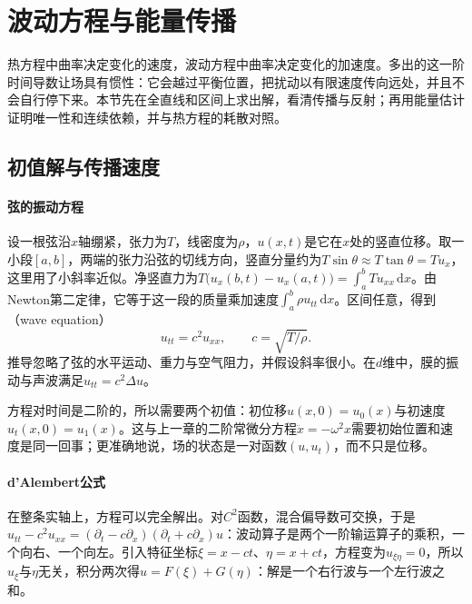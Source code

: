
\section{波动方程与能量传播}
\label{sec:pde-wave}

热方程中曲率决定变化的速度，波动方程中曲率决定变化的加速度。多出的这一阶时间导数让场具有惯性：它会越过平衡位置，把扰动以有限速度传向远处，并且不会自行停下来。本节先在全直线和区间上求出解，看清传播与反射；再用能量估计证明唯一性和连续依赖，并与热方程的耗散对照。

\subsection{初值解与传播速度}
\label{sec:pde-wave-solution}

\paragraph{弦的振动方程}
设一根弦沿$x$轴绷紧，张力为$T$，线密度为$\rho$，$u(x,t)$是它在$x$处的竖直位移。取一小段$[a,b]$，两端的张力沿弦的切线方向，竖直分量约为$T\sin\theta\approx T\tan\theta=Tu_x$，这里用了小斜率近似。净竖直力为$T\bigl(u_x(b,t)-u_x(a,t)\bigr)=\int_a^bTu_{xx}\,\mathrm dx$。由Newton第二定律，它等于这一段的质量乘加速度$\int_a^b\rho u_{tt}\,\mathrm dx$。区间任意，得到（wave equation）
\begin{equation}
  u_{tt}=c^2u_{xx},\qquad c=\sqrt{T/\rho} .
  \label{eq:pde-wave-1d}
\end{equation}
推导忽略了弦的水平运动、重力与空气阻力，并假设斜率很小。在$d$维中，膜的振动与声波满足$u_{tt}=c^2\Delta u$。

方程对时间是二阶的，所以需要两个初值：初位移$u(x,0)=u_0(x)$与初速度$u_t(x,0)=u_1(x)$。这与上一章的二阶常微分方程$\ddot x=-\omega^2x$需要初始位置和速度是同一回事；更准确地说，场的状态是一对函数$(u,u_t)$，而不只是位移。

\paragraph{d'Alembert公式}
在整条实轴上，方程可以完全解出。对$C^2$函数，混合偏导数可交换，于是$u_{tt}-c^2u_{xx}=(\partial_t-c\partial_x)(\partial_t+c\partial_x)u$：波动算子是两个一阶输运算子的乘积，一个向右、一个向左。引入特征坐标$\xi=x-ct$、$\eta=x+ct$，方程变为$u_{\xi\eta}=0$，所以$u_\xi$与$\eta$无关，积分两次得$u=F(\xi)+G(\eta)$：解是一个右行波与一个左行波之和。

